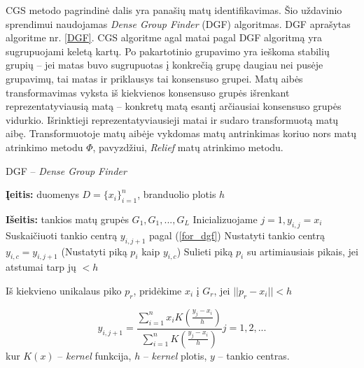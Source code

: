 CGS metodo pagrindinė dalis yra panašių matų identifikavimas. Šio uždavinio sprendimui naudojamas \textit{Dense Group Finder} (DGF) algoritmas. DGF aprašytas algoritme nr. \ref{DGF}. CGS algoritme agal matai pagal DGF algoritmą yra sugrupuojami keletą kartų. Po pakartotinio grupavimo yra ieškoma stabilių grupių -- jei matas buvo sugrupuotas į konkrečią grupę daugiau nei pusėje grupavimų, tai matas ir priklausys tai konsensuso grupei. Matų aibės transformavimas vyksta iš kiekvienos konsensuso grupės išrenkant reprezentatyviausią matą -- konkretų matą esantį arčiausiai konsensuso grupės vidurkio. Išrinktieji reprezentatyviausieji matai ir sudaro transformuotą matų aibę. Transformuotoje matų aibėje vykdomas matų antrinkimas koriuo nors matų atrinkimo metodu $\Phi$, pavyzdžiui, \textit{Relief} matų atrinkimo metodu. 
\begin{algorithm}
\caption{DGF -- \textit{Dense Group Finder}}
\label{DGF}
 \begin{algorithmic}
 \item \textbf{Įeitis:} duomenys $D=\{x_i\}_{i=1}^n$, branduolio plotis $h$
 \item \textbf{Išeitis:} tankios matų grupės $G_1, G_1,..., G_L$
  \State Inicializuojame $j=1, y_{i,j}=x_i$
  \Repeat
    \State Suskaičiuoti tankio centrą $y_{i, j+1}$ pagal (\ref{for_dgf})
  \State Nustatyti tankio centrą $y_{i,c} = y_{i,j+1}$ (Nustatyti piką $p_i$ kaip $y_{i,c}$)
  \State Sulieti piką $p_i$ su artimiausiais pikais, jei atstumai tarp jų $ < h$
 \EndFor
 \item Iš kiekvieno unikalaus piko $p_r$, pridėkime $x_i$ į $G_r$, jei $||p_r - x_i|| < h$
 \end{algorithmic}
\end{algorithm}

\begin{equation}
\label{for_dgf}
  y_{i, j+1}=\frac{\sum_{i=1}^{n} x_i K(\frac{y_j - x_i}{h})}{\sum_{i=1}^{n} K(\frac{y_j - x_i}{h})} j=1,2,...
\end{equation}
kur $K(x)$ -- \textit{kernel} funkcija, $h$ -- \textit{kernel} plotis, $y$ -- tankio centras.

